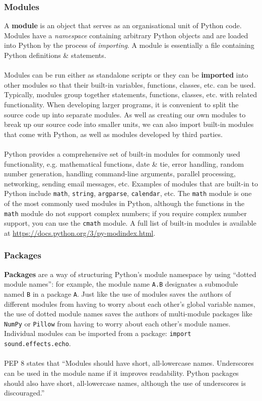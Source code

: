 \documentclass[a4paper,11pt]{article}
\begin{document}
\subsubsection{Modules}
A \textbf{module} is an object that serves as an organisational unit of Python code.
Modules have a \textit{namespace} containing arbitrary Python objects and are loaded into Python by the process
of \textit{importing}.
A module is essentially a file containing Python definitions \& statements.
\\\\
Modules can be run either as standalone scripts or they can be \textbf{imported} into other modules so that their
built-in variables, functions, classes, etc. can be used.
Typically, modules group together statements, functions, classes, etc. with related functionality.
When developing larger programs, it is convenient to split the source code up into separate modules.
As well as creating our own modules to break up our source code into smaller units, we can also import built-in 
modules that come with Python, as well as modules developed by third parties.
\\\\
Python provides a comprehensive set of built-in modules for commonly used functionality, e.g. mathematical 
functions, date \& tie, error handling, random number generation, handling command-line arguments, parallel
processing, networking, sending email messages, etc.
Examples of modules that are built-in to Python include \texttt{math}, \texttt{string},
\texttt{argparse}, \texttt{calendar}, etc.
The \texttt{math} module is one of the most commonly used modules in Python, although the functions 
in the \texttt{math} module do not support complex numbers; if you require complex number support,
you can use the \texttt{cmath} module.
A full list of built-in modules is available at \url{https://docs.python.org/3/py-modindex.html}.

\subsubsection{Packages}
\textbf{Packages} are a way of structuring Python's module namespace by using ``dotted module names'':
for example, the module name \texttt{A.B} designates a submodule named \texttt{B} in a 
package \texttt{A}.
Just like the use of modules saves the authors of different modules from having to worry about each other's global
variable names, the use of dotted module names saves the authors of multi-module packages like
\texttt{NumPy} or \texttt{Pillow} from having to worry about each other's module names.
Individual modules can be imported from a package: \texttt{import sound.effects.echo}.
\\\\
PEP 8 states that ``Modules should have short, all-lowercase names.
Underscores can be used in the module name if it improves readability.
Python packages should also have short, all-lowercase names, although the use of underscores is discouraged.''
\end{document}
